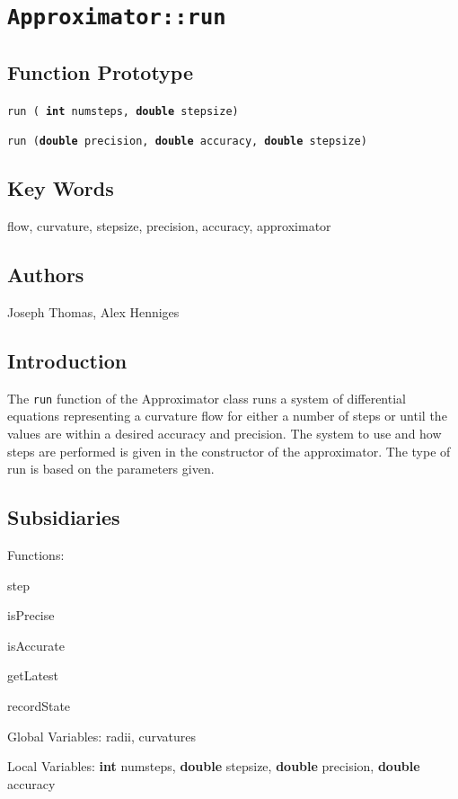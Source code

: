 \documentclass[12pt]{article}%
\begin{document}
\section*{\texttt{Approximator::run}}

\subsection*{Function Prototype}

\texttt{run ( \textbf{int} numsteps, \textbf{double} stepsize)} \	

\texttt{run (\textbf{double} precision, \textbf{double} accuracy, \textbf{double} stepsize)} \	

\subsection*{Key Words}
flow, curvature, stepsize, precision, accuracy, approximator

\subsection*{Authors}
Joseph Thomas, Alex Henniges

\subsection*{Introduction}

The \texttt{run} function of the Approximator class runs a system of differential equations representing a curvature flow for either a number of steps or until the values are within a desired accuracy and precision. The system to use and how steps are performed is given in the constructor of the approximator. The type of run is based on the parameters given.\ 

\subsection*{Subsidiaries}

Functions:

\qquad step

\qquad isPrecise

\qquad isAccurate

\qquad getLatest

\qquad\qquad recordState

Global Variables: radii, curvatures

Local Variables: \textbf{int} numsteps, \textbf{double} stepsize, \textbf{double} precision, \textbf{double} accuracy
\end{document}
